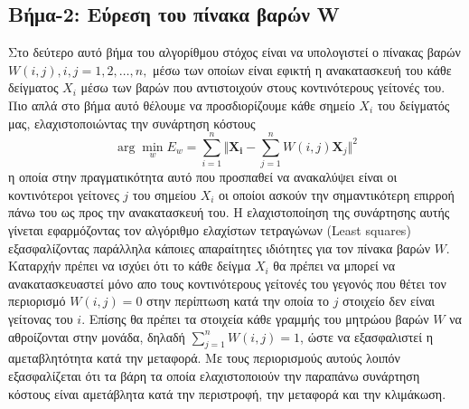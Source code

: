 \subsection{Βήμα-2: Εύρεση του πίνακα βαρών \textlatin{W}}
\par
Στο δεύτερο αυτό βήμα του αλγορίθμου στόχος είναι να υπολογιστεί ο πίνακας βαρών $W(i,j),i,j=1,2,\ldots,n,$ μέσω των οποίων είναι εφικτή η ανακατασκευή του κάθε δείγματος $X_{i}$ μέσω των βαρών που αντιστοιχούν στους κοντινότερους γείτονές του. Πιο απλά στο βήμα αυτό θέλουμε να προσδιορίζουμε κάθε σημείο $X_{i}$ του δείγματός μας, ελαχιστοποιώντας την συνάρτηση κόστους
\newline\hspace*{\fill}
\begin{equation}
        \arg \min_{w} E_{w} = \sum_{i=1}^{n} \Vert \mathbf{X_{i}} - \sum_{j=1}^{n} W(i,j)\mathbf{X}_{j} \Vert ^{2}
\end{equation}
\hspace*{\fill}\newline
η οποία στην πραγματικότητα αυτό που προσπαθεί να ανακαλύψει είναι οι κοντινότεροι γείτονες $j$ του σημείου $X_{i}$ οι οποίοι ασκούν την σημαντικότερη επιρροή πάνω του ως προς την ανακατασκευή του. Η ελαχιστοποίηση της συνάρτησης αυτής γίνεται εφαρμόζοντας τον αλγόριθμο ελαχίστων τετραγώνων %
({\textlatin{Least squares}}) εξασφαλίζοντας παράλληλα κάποιες απαραίτητες ιδιότητες για τον πίνακα βαρών $W$. Καταρχήν πρέπει να ισχύει ότι το κάθε δείγμα $X_{i}$ θα πρέπει να μπορεί να ανακατασκευαστεί μόνο απο τους κοντινότερους γείτονές του γεγονός που θέτει τον περιορισμό $W(i,j)=0$ στην περίπτωση κατά την οποία το $j$ στοιχείο δεν είναι γείτονας του $i$. Επίσης θα πρέπει τα στοιχεία κάθε γραμμής του μητρώου βαρών $W$ να αθροίζονται στην μονάδα, δηλαδή $\sum_{j=1}^{n} W(i,j)=1$, ώστε να εξασφαλιστεί η αμεταβλητότητα κατά την μεταφορά. Με τους περιορισμούς αυτούς λοιπόν εξασφαλίζεται ότι τα βάρη τα οποία ελαχιστοποιούν την παραπάνω συνάρτηση κόστους είναι αμετάβλητα κατά την περιστροφή, την μεταφορά και την κλιμάκωση.
\par
